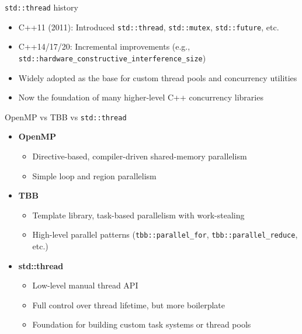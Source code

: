\documentclass{beamer}
\begin{document}
\begin{frame}{\texttt{std::thread} history}
  \begin{itemize}
    \item C++11 (2011): Introduced \texttt{std::thread}, \texttt{std::mutex}, \texttt{std::future}, etc.
    \item C++14/17/20: Incremental improvements (e.g., \texttt{std::hardware\_constructive\_interference\_size})
    \item Widely adopted as the base for custom thread pools and concurrency utilities
    \item Now the foundation of many higher-level C++ concurrency libraries
  \end{itemize}
\end{frame}

\begin{frame}{OpenMP vs TBB vs \texttt{std::thread}}
  \begin{itemize}
    \item \textbf{OpenMP}
      \begin{itemize}
        \item Directive-based, compiler-driven shared-memory parallelism
        \item Simple loop and region parallelism
      \end{itemize}
    \item \textbf{TBB}
      \begin{itemize}
        \item Template library, task-based parallelism with work-stealing
        \item High-level parallel patterns (\texttt{tbb::parallel\_for}, \texttt{tbb::parallel\_reduce}, etc.)
      \end{itemize}
    \item \textbf{std::thread}
      \begin{itemize}
        \item Low-level manual thread API
        \item Full control over thread lifetime, but more boilerplate
        \item Foundation for building custom task systems or thread pools
      \end{itemize}
  \end{itemize}
\end{frame}
\end{document}
